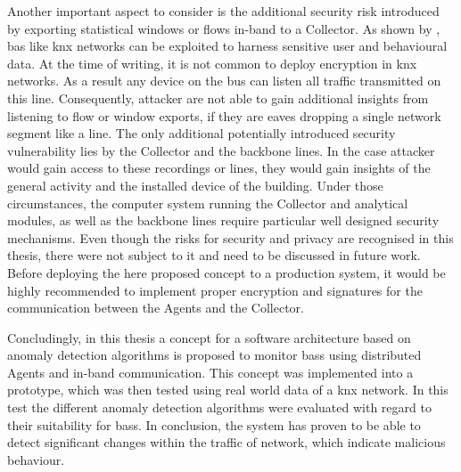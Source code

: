 Another important aspect to consider is the additional security risk introduced by exporting statistical windows or flows in-band to a Collector.
As shown by \textcite{Mundt2012}, \gls{bas} like \gls{knx} networks can be exploited to harness sensitive user and behavioural data.
At the time of writing, it is not common to deploy encryption in \gls{knx} networks.
As a result any device on the bus can listen all traffic transmitted on this line.
Consequently, attacker are not able to gain additional insights from listening to flow or window exports, if they are eaves dropping a single network segment like a line.
The only additional potentially introduced security vulnerability lies by the Collector and the backbone lines. In the case attacker would gain access to these recordings or lines, they would gain insights of the general activity and the installed device of the building.
Under those circumstances, the computer system running the Collector and analytical modules, as well as the backbone lines require particular well designed security mechanisms.
Even though the risks for security and privacy are recognised in this thesis, there were not subject to it and need to be discussed in future work.
Before deploying the here proposed concept to a production system, it would be highly recommended to implement proper encryption and signatures for the communication between the Agents and the Collector. %

Concludingly, in this thesis a concept for a software architecture based on anomaly detection algorithms is proposed to monitor \glspl{bas} using distributed Agents and in-band communication. This concept was implemented into a prototype, which was then tested using real world data of a \gls{knx} network.
In this test the different anomaly detection algorithms were evaluated with regard to their suitability for \glspl{bas}.
In conclusion, the system has proven to be able to detect significant changes within the traffic of network, which indicate malicious behaviour.